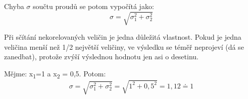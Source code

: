 Chyba $\sigma$ součtu proudů se potom vypočítá jako:
\begin{equation}
\sigma = \sqrt{\sigma_{1}^{2}+\sigma_{2}^{2}}
\end{equation}

Při sčítání nekorelovaných veličin je jedna důležitá vlastnost. Pokud je jedna veličina menší než 1/2 největší veličiny, ve výsledku se téměř neprojeví (dá se zanedbat), protože zvýší výslednou hodnotu jen asi o desetinu.

Mějme: x\textsubscript{1}=1 a x\textsubscript{2} = 0,5. Potom:
\begin{equation}
\sigma = \sqrt{\sigma_{1}^{2}+\sigma_{2}^{2}}=\sqrt{1^{2}+0,5^{2}}=1,12\doteq 1
\end{equation}

